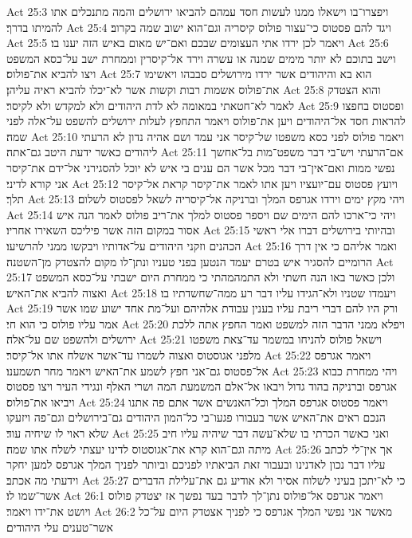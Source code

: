 Act 25:3  ויפצרו־בו וישאלו ממנו לעשות חסד עמהם להביאו ירושלים והמה מתנכלים אתו להמיתו בדרך׃
Act 25:4  ויגד להם פסטוס כי־עצור פולוס קיסריה וגם־הוא ישוב שמה בקרוב׃
Act 25:5  ויאמר לכן ירדו אתי העצומים שבכם ואם־יש מאום באיש הזה יענו בו׃
Act 25:6  וישב בתוכם לא יותר מימים שמנה או עשרה וירד אל־קיסרין וממחרת ישב על־כסא המשפט ויצו להביא את־פולוס׃
Act 25:7  הוא בא והיהודים אשר ירדו מירושלים סבבהו ויאשימו את־פולוס אשמות רבות וקשות אשר לא־יכלו להביא ראיה עליהן׃
Act 25:8  והוא הצטדק לאמר לא־חטאתי במאומה לא לדת היהודים ולא למקדש ולא לקיסר׃
Act 25:9  ופסטוס בחפצו להראות חסד אל־היהודים ויען את־פולוס ויאמר התחפץ לעלות ירושלים להשפט על־אלה לפני שמה׃
Act 25:10  ויאמר פולוס לפני כסא משפטו של־קיסר אני עמד ושם אהיה נדון לא הרעתי ליהודים כאשר ידעת היטב גם־אתה׃
Act 25:11  אם־הרעתי ויש־בי דבר משפט־מות בל־אחשך נפשי ממות ואם־אין־בי דבר מכל אשר הם ענים בי איש לא יוכל להסגירני אל־ידם את־קיסר אני קורא לדיני׃
Act 25:12  ויועץ פסטוס עם־יועציו ויען אתו לאמר את־קיסר קראת אל־קיסר תלך׃
Act 25:13  ויהי מקץ ימים וירדו אגרפס המלך וברניקה אל־קיסריה לשאל לפסטוס לשלום׃
Act 25:14  ויהי כי־ארכו להם הימים שם ויספר פסטוס למלך את־ריב פולוס לאמר הנה איש אסור במקום הזה אשר פיליכס השאירו אחריו׃
Act 25:15  ובהיותי בירושלים דברו אלי ראשי הכהנים וזקני היהודים על־אדותיו ויבקשו ממני להרשיעו׃
Act 25:16  ואמר אליהם כי אין דרך הרומיים להסגיר איש בטרם יעמד הנטען בפני טעניו ונתן־לו מקום להצטדק מן־השטנה׃
Act 25:17  ולכן כאשר באו הנה חשתי ולא התמהמהתי כי ממחרת היום ישבתי על־כסא המשפט ואצוה להביא את־האיש׃
Act 25:18  ויעמדו שטניו ולא־הגידו עליו דבר רע ממה־שחשדתיו בו׃
Act 25:19  ורק היו להם דברי ריבת עליו בענין עבודת אלהיהם ועל־מת אחד ישוע שמו אשר אמר עליו פולוס כי הוא חי׃
Act 25:20  ויפלא ממני הדבר הזה למשפט ואמר החפץ אתה ללכת ירושלים ולהשפט שם על־אלה׃
Act 25:21  וישאל פולוס להניחו במשמר עד־צאת משפטו מלפני אגוסטוס ואצוה לשמרו עד־אשר אשלח אתו אל־קיסר׃
Act 25:22  ויאמר אגרפס אל־פסטוס גם־אני חפץ לשמע את־האיש ויאמר מחר תשמענו׃
Act 25:23  ויהי ממחרת כבוא אגרפס וברניקה בהוד גדול ויבאו אל־אלם המשמעת המה ושרי האלף ונגידי העיר ויצו פסטוס ויביאו את־פולוס׃
Act 25:24  ויאמר פסטוס אגרפס המלך וכל־האנשים אשר אתם פה אתנו הנכם ראים את־האיש אשר בעבורו פגעו־בי כל־המון היהודים גם־בירושלים וגם־פה ויזעקו שלא ראוי לו שיחיה עוד׃
Act 25:25  ואני כאשר הכרתי בו שלא־עשה דבר שיהיה עליו חיב מיתה וגם־הוא קרא את־אגוסטוס לדינו יעצתי לשלח אתו שמה׃
Act 25:26  אך אין־לי לכתב עליו דבר נכון לאדנינו ובעבור זאת הביאתיו לפניכם וביותר לפניך המלך אגרפס למען יחקר וידעתי מה אכתב׃
Act 25:27  כי לא־יתכן בעיני לשלוח אסיר ולא אודיע גם את־עלילת הדברים אשר־שמו לו׃
Act 26:1  ויאמר אגרפס אל־פולוס נתן־לך לדבר בעד נפשך אז יצטדק פולוס ויושט את־ידו ויאמר׃
Act 26:2  מאשר אני נפשי המלך אגרפס כי לפניך אצטדק היום על־כל אשר־טענים עלי היהודים׃
